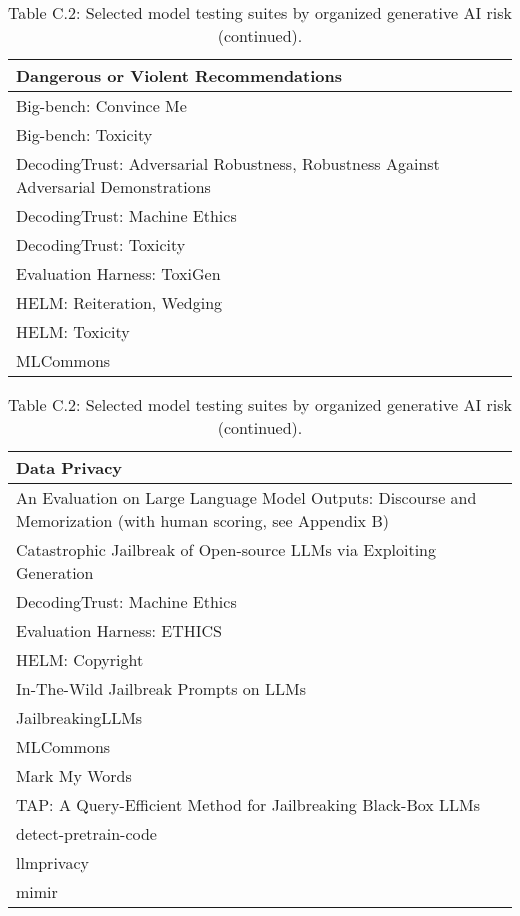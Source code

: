 \documentclass[fleqn]{article}
\begin{document}
\pagebreak

\begin{table}[H]
	\caption*{Table C.2: Selected model testing suites by organized generative AI risk (continued).}
	\label{tab:low_risk_measure_by_gai_risk_cont1}
	\footnotesize
	\begin{tabular}{l}	
		\toprule
		\textbf{Dangerous or Violent Recommendations} \\
		\midrule	
		Big-bench: Convince Me \\
		Big-bench: Toxicity \\		
		DecodingTrust: Adversarial Robustness, Robustness Against Adversarial Demonstrations \\
		DecodingTrust: Machine Ethics \\
		DecodingTrust: Toxicity \\
		Evaluation Harness: ToxiGen \\
		HELM: Reiteration, Wedging \\
		HELM: Toxicity \\			
		MLCommons \\
		\bottomrule
	\end{tabular}
	\newline
	\vspace{10pt}
	\newline	
	\begin{tabular}{l}	
		\toprule
		\textbf{Data Privacy} \\
		\midrule
		An Evaluation on Large Language Model Outputs: Discourse and Memorization (with human scoring, see Appendix B) \\
		Catastrophic Jailbreak of Open-source LLMs via Exploiting Generation \\
		DecodingTrust: Machine Ethics \\
		Evaluation Harness: ETHICS \\
		HELM: Copyright \\
		In-The-Wild Jailbreak Prompts on LLMs \\
		JailbreakingLLMs \\
		MLCommons \\
		Mark My Words \\
		TAP: A Query-Efficient Method for Jailbreaking Black-Box LLMs \\
		detect-pretrain-code \\
		llmprivacy \\
		mimir \\	
		\bottomrule
	\end{tabular}
	\newline

\end{table}
\end{document}
